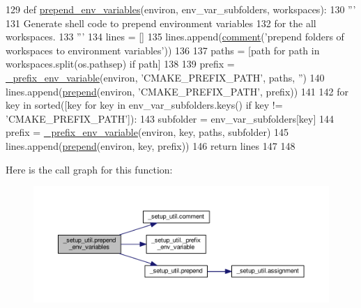 \begin{DoxyCode}
129 \textcolor{keyword}{def }\hyperlink{namespace__setup__util_a832417d18b85bd1d276a87547e86f860}{prepend\_env\_variables}(environ, env\_var\_subfolders, workspaces):
130     \textcolor{stringliteral}{'''}
131 \textcolor{stringliteral}{    Generate shell code to prepend environment variables}
132 \textcolor{stringliteral}{    for the all workspaces.}
133 \textcolor{stringliteral}{    '''}
134     lines = []
135     lines.append(\hyperlink{namespace__setup__util_abe8c95c4cfe8b1374dacd5f91d984353}{comment}(\textcolor{stringliteral}{'prepend folders of workspaces to environment variables'}))
136 
137     paths = [path \textcolor{keywordflow}{for} path \textcolor{keywordflow}{in} workspaces.split(os.pathsep) \textcolor{keywordflow}{if} path]
138 
139     prefix = \hyperlink{namespace__setup__util_a74a1f8575ed82282d03f7795c9ba6e45}{\_prefix\_env\_variable}(environ, \textcolor{stringliteral}{'CMAKE\_PREFIX\_PATH'}, paths, \textcolor{stringliteral}{''})
140     lines.append(\hyperlink{namespace__setup__util_ae78d86b2c4279f5b8b1acaa146c35802}{prepend}(environ, \textcolor{stringliteral}{'CMAKE\_PREFIX\_PATH'}, prefix))
141 
142     \textcolor{keywordflow}{for} key \textcolor{keywordflow}{in} sorted([key \textcolor{keywordflow}{for} key \textcolor{keywordflow}{in} env\_var\_subfolders.keys() \textcolor{keywordflow}{if} key != \textcolor{stringliteral}{'CMAKE\_PREFIX\_PATH'}]):
143         subfolder = env\_var\_subfolders[key]
144         prefix = \hyperlink{namespace__setup__util_a74a1f8575ed82282d03f7795c9ba6e45}{\_prefix\_env\_variable}(environ, key, paths, subfolder)
145         lines.append(\hyperlink{namespace__setup__util_ae78d86b2c4279f5b8b1acaa146c35802}{prepend}(environ, key, prefix))
146     \textcolor{keywordflow}{return} lines
147 
148 
\end{DoxyCode}


Here is the call graph for this function\+:\nopagebreak
\begin{figure}[H]
\begin{center}
\leavevmode
\includegraphics[width=350pt]{namespace__setup__util_a832417d18b85bd1d276a87547e86f860_cgraph}
\end{center}
\end{figure}


